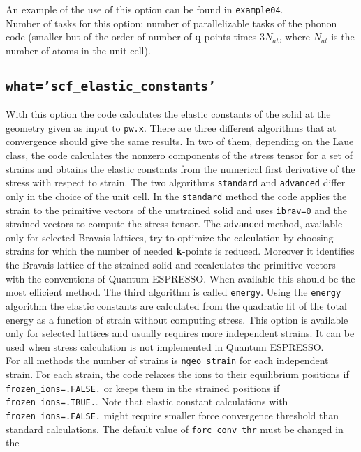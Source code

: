\documentclass[12pt,a4paper]{article}
\def\qe{{\sc Quantum ESPRESSO}}
\begin{document}
An example of the use of this option can be found in \texttt{example04}. \\
Number of tasks for this option: number of parallelizable tasks of the 
phonon code (smaller but of the order of number of {\bf q} points times 
$3 N_{at}$, where $N_{at}$ is the number of atoms in the unit cell).

\subsection{\color{web-blue}\texttt{what='scf\_elastic\_constants'}}
With this option the code calculates the elastic constants of the solid
at the geometry given as input to \texttt{pw.x}. 
There are three different algorithms that at convergence should give the
same results. In two of them, depending on the Laue class, the code 
calculates the nonzero components of the stress tensor for a set of strains
and obtains the elastic constants from the numerical first derivative
of the stress with respect to strain.
The two algorithms \texttt{standard} and \texttt{advanced} differ
only in the choice of the unit cell. In the \texttt{standard} method the
code applies the strain to the primitive vectors of the unstrained solid
and uses \texttt{ibrav=0} and the strained vectors to compute the stress
tensor.
The \texttt{advanced}  method, available only for selected Bravais lattices, 
try to optimize the calculation by choosing strains for which the number
of needed {\bf k}-points is reduced. Moreover it identifies the 
Bravais lattice of the strained solid and recalculates the primitive
vectors with the conventions of \qe. When available this should be the
most efficient method.
The third algorithm is called \texttt{energy}.
Using the \texttt{energy} algorithm the elastic constants are calculated 
from the quadratic fit of the total energy as a function of strain
without computing stress. This option is available only for selected 
lattices and usually requires more independent strains. It can be
used when stress calculation is not implemented in \qe.\\
For all methods the number of strains is \texttt{ngeo\_strain}
for each independent strain. 
For each strain, the code relaxes the ions to their equilibrium 
positions if \texttt{frozen\_ions=.FALSE.} or keeps them
in the strained positions if \texttt{frozen\_ions=.TRUE.}. 
Note that elastic constant calculations with \texttt{frozen\_ions=.FALSE.}
might require smaller force convergence threshold than standard calculations. 
The default value of \texttt{forc\_conv\_thr} must be changed in the 
\end{document}
